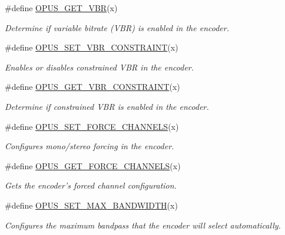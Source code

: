 \begin{DoxyCompactItemize}
\#define \hyperlink{group__opus__encoderctls_ga58feba30c167962305ec268e6abe8c08}{OPUS\_\-GET\_\-VBR}(x)
\begin{DoxyCompactList}\small\item\em Determine if variable bitrate (VBR) is enabled in the encoder. \item\end{DoxyCompactList}\item 
\#define \hyperlink{group__opus__encoderctls_gab1b534a4fe55373f1be407ad4b2b22bd}{OPUS\_\-SET\_\-VBR\_\-CONSTRAINT}(x)
\begin{DoxyCompactList}\small\item\em Enables or disables constrained VBR in the encoder. \item\end{DoxyCompactList}\item 
\#define \hyperlink{group__opus__encoderctls_gab35fa5691ba0dd932031b7839c47513c}{OPUS\_\-GET\_\-VBR\_\-CONSTRAINT}(x)
\begin{DoxyCompactList}\small\item\em Determine if constrained VBR is enabled in the encoder. \item\end{DoxyCompactList}\item 
\#define \hyperlink{group__opus__encoderctls_ga8450a745bd919a8de522afec115f3b5f}{OPUS\_\-SET\_\-FORCE\_\-CHANNELS}(x)
\begin{DoxyCompactList}\small\item\em Configures mono/stereo forcing in the encoder. \item\end{DoxyCompactList}\item 
\#define \hyperlink{group__opus__encoderctls_ga21f010167c5dfa1b53f20c46d473e86a}{OPUS\_\-GET\_\-FORCE\_\-CHANNELS}(x)
\begin{DoxyCompactList}\small\item\em Gets the encoder's forced channel configuration. \item\end{DoxyCompactList}\item 
\#define \hyperlink{group__opus__encoderctls_ga4f88288e89c595c07c61db316cc45289}{OPUS\_\-SET\_\-MAX\_\-BANDWIDTH}(x)
\begin{DoxyCompactList}\small\item\em Configures the maximum bandpass that the encoder will select automatically. \item\end{DoxyCompactList}\item 

\end{DoxyCompactItemize}
